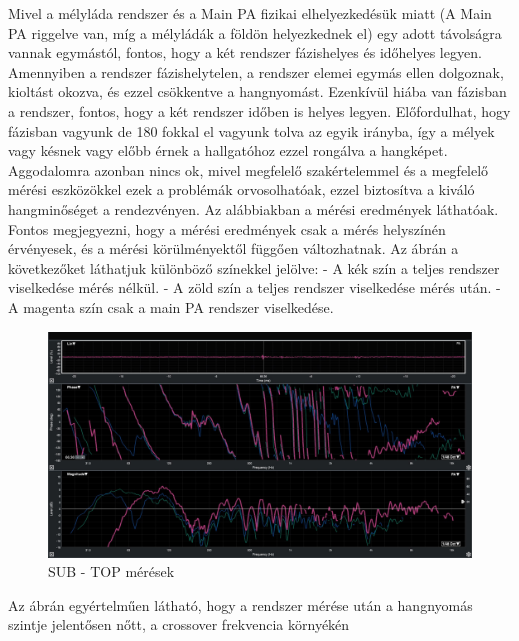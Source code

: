 Mivel a mélyláda rendszer és a Main PA fizikai elhelyezkedésük miatt (A Main PA riggelve van, míg a mélyládák a földön helyezkednek el)
egy adott távolságra vannak egymástól, fontos, hogy a két rendszer fázishelyes és időhelyes legyen.
Amennyiben a rendszer fázishelytelen, a rendszer elemei egymás ellen dolgoznak, kioltást okozva, és ezzel csökkentve a hangnyomást.
Ezenkívül hiába van fázisban a rendszer, fontos, hogy a két rendszer időben is helyes legyen. Előfordulhat, hogy fázisban vagyunk de 180 fokkal el vagyunk tolva
az egyik irányba, így a mélyek vagy késnek vagy előbb érnek a hallgatóhoz ezzel rongálva a hangképet.
Aggodalomra azonban nincs ok, mivel megfelelő szakértelemmel és a megfelelő mérési eszközökkel ezek a problémák orvosolhatóak, ezzel biztosítva
a kiváló hangminőséget a rendezvényen.
Az alábbiakban a mérési eredmények láthatóak.
Fontos megjegyezni, hogy a mérési eredmények csak a mérés helyszínén érvényesek, és a mérési körülményektől függően változhatnak.
Az ábrán a következőket láthatjuk különböző színekkel jelölve:
- A kék szín a teljes rendszer viselkedése mérés nélkül.
- A zöld szín a teljes rendszer viselkedése mérés után.
- A magenta szín csak a main PA rendszer viselkedése.
\begin{figure}[H]
	\centering
	\includegraphics[width=\textwidth, keepaspectratio]{figures/smaart_sub_top.jpg}
	\caption{SUB - TOP mérések}\label{fig:smaart_sub_top}
\end{figure}
Az ábrán egyértelműen látható, hogy a rendszer mérése után a hangnyomás szintje jelentősen nőtt, a crossover frekvencia környékén
